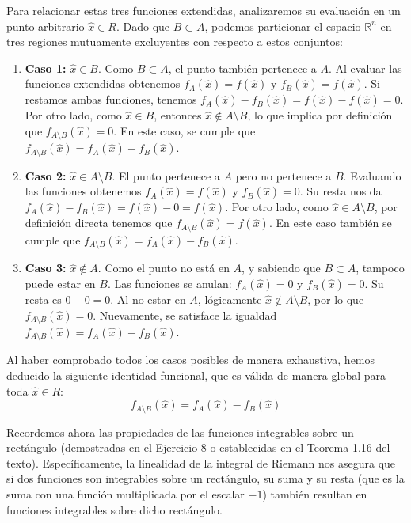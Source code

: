 \documentclass[11pt,letterpaper]{article}
\begin{document}
Para relacionar estas tres funciones extendidas, analizaremos su evaluación en un punto arbitrario $\hat{x} \in R$. Dado que $B \subset A$, podemos particionar el espacio $\mathbb{R}^n$ en tres regiones mutuamente excluyentes con respecto a estos conjuntos:
\begin{enumerate}
    \item \textbf{Caso 1:} $\hat{x} \in B$. 
    Como $B \subset A$, el punto también pertenece a $A$. Al evaluar las funciones extendidas obtenemos $f_A(\hat{x}) = f(\hat{x})$ y $f_B(\hat{x}) = f(\hat{x})$. Si restamos ambas funciones, tenemos $f_A(\hat{x}) - f_B(\hat{x}) = f(\hat{x}) - f(\hat{x}) = 0$.
    Por otro lado, como $\hat{x} \in B$, entonces $\hat{x} \notin A \setminus B$, lo que implica por definición que $f_{A \setminus B}(\hat{x}) = 0$. 
    En este caso, se cumple que $f_{A \setminus B}(\hat{x}) = f_A(\hat{x}) - f_B(\hat{x})$.

    \item \textbf{Caso 2:} $\hat{x} \in A \setminus B$. 
    El punto pertenece a $A$ pero no pertenece a $B$. Evaluando las funciones obtenemos $f_A(\hat{x}) = f(\hat{x})$ y $f_B(\hat{x}) = 0$. Su resta nos da $f_A(\hat{x}) - f_B(\hat{x}) = f(\hat{x}) - 0 = f(\hat{x})$.
    Por otro lado, como $\hat{x} \in A \setminus B$, por definición directa tenemos que $f_{A \setminus B}(\hat{x}) = f(\hat{x})$. 
    En este caso también se cumple que $f_{A \setminus B}(\hat{x}) = f_A(\hat{x}) - f_B(\hat{x})$.

    \item \textbf{Caso 3:} $\hat{x} \notin A$. 
    Como el punto no está en $A$, y sabiendo que $B \subset A$, tampoco puede estar en $B$. Las funciones se anulan: $f_A(\hat{x}) = 0$ y $f_B(\hat{x}) = 0$. Su resta es $0 - 0 = 0$.
    Al no estar en $A$, lógicamente $\hat{x} \notin A \setminus B$, por lo que $f_{A \setminus B}(\hat{x}) = 0$.
    Nuevamente, se satisface la igualdad $f_{A \setminus B}(\hat{x}) = f_A(\hat{x}) - f_B(\hat{x})$.
\end{enumerate}

Al haber comprobado todos los casos posibles de manera exhaustiva, hemos deducido la siguiente identidad funcional, que es válida de manera global para toda $\hat{x} \in R$:
\begin{equation*}
f_{A \setminus B}(\hat{x}) = f_A(\hat{x}) - f_B(\hat{x})
\end{equation*}

Recordemos ahora las propiedades de las funciones integrables sobre un rectángulo (demostradas en el Ejercicio 8 o establecidas en el Teorema 1.16 del texto). Específicamente, la linealidad de la integral de Riemann nos asegura que si dos funciones son integrables sobre un rectángulo, su suma y su resta (que es la suma con una función multiplicada por el escalar $-1$) también resultan en funciones integrables sobre dicho rectángulo.
\end{document}
